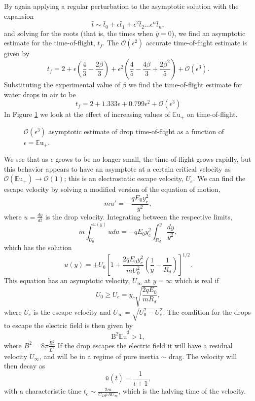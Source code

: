 \documentclass[12pt,a4paper,oneside]{book}
\begin{document}
By again applying a regular perturbation to the asymptotic solution with the expansion
\[ \bar{t} \sim \bar{t}_0 + \epsilon \bar{t}_1 + \epsilon^2 \bar{t}_2 \ldots \epsilon^n\bar{t}_n  
,\]
and solving for the roots (that is, the times when $\bar{y} = 0$), we find an asymptotic estimate for the time-of-flight, $t_f$. The $\mathcal{O}(\epsilon^2)$ accurate time-of-flight estimate is given by
\[t_f = 2 + \epsilon \left(\frac{4}{3} - \frac{2 \beta}{3}\right) + \epsilon^{2} \left(\frac{4}{5} - \frac{4 \beta}{3} + \frac{2 \beta^{2}}{5}\right) + \mathcal{O}(\epsilon^3).\]
Substituting the experimental value of $\beta$ we find the time-of-flight estimate for water drops in air to be
\begin{equation} \label{time_of_flight}
t_f = 2 + 1.333 \epsilon + 0.799 \epsilon^{2} + \mathcal{O}(\epsilon^3) 
\end{equation} 
In Figure \ref{fig:drag} we look at the effect of increasing values of ${\mathbb{E}\mbox{u}}_+$ on time-of-flight.
\begin{figure}[htb]
    \centering
    
    \caption{$\mathcal{O}(\epsilon^3)$ asymptotic estimate of drop time-of-flight as a function of $\epsilon = {\mathbb{E}\mbox{u}}_+$.}
    \label{fig:drag}
\end{figure}
We see that as $\epsilon$ grows to be no longer small, the time-of-flight grows rapidly, but this behavior appears to have an asymptote at a certain critical velocity as $\mathcal{O}({\mathbb{E}\mbox{u}}_+) \rightarrow \mathcal{O}(1)$; this is an electrostatic escape velocity, $U_e$. We can find the escape velocity by solving a modified version of the equation of motion,
\[ m u' = - \frac{q E_0 y_c^2}{y^2}, \]
where $u = \frac{d y}{d t}$ is the drop velocity. Integrating between the respective limits,
\[m \int^{u(y)}_{U_0} u du = -q E_0 y_c^2 \int^y_{R_d} \frac{dy}{y^2} ,\]
which has the solution
\[ u(y) = \pm U_0 \left[1 + \frac{2q E_0 y_c^2}{m U_0^2} \left( \frac{1}{y} - \frac{1}{R_d} \right) \right]^{1/2}.
\]
This equation has an asymptotic velocity, $U_{\infty}$ at $y = \infty$ which is real if 
\[ U_0 \geq  U_e = y_c \sqrt{\frac{2 q E_0 }{m R_d}},
\]
where $U_e$ is the escape velocity and $U_{\infty} = \sqrt{U_0^2 - U_e^2}$. The condition for the drops to escape the electric field is then given by
\begin{equation}\label{escape}
{\mbox{B}^2 \mathbb{E}\mbox{u}}^3 > 1,
\end{equation}
where $B^2= 8 \pi\frac{ R_d^2}{L^2}$ If the drop escapes the electric field it will have a residual velocity $U_{\infty}$, and will be in a regime of pure inertia $\sim$ drag. The velocity will then decay as
\[
\bar{u}(\bar{t}) = \frac{1}{\bar{t} + 1},
\]
with a characteristic time $t_c \sim \frac{2 m}{C_D \rho A U_{\infty}}$, which is the halving time of the velocity. 
\end{document}
